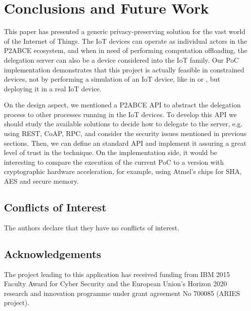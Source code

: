 \section{Conclusions and Future Work}\label{ch:conclusions}

This paper has presented a generic privacy-preserving solution for the vast world of the Internet of Things. The IoT devices can operate as individual actors in the P2ABCE ecosystem, and when in need of performing computation offloading, the delegation server can also be a device considered into the IoT family.
Our PoC implementation demonstrates that this project is actually feasible in constrained devices, not by performing a simulation of an IoT device, like in \cite{vanet} or \cite{alcaide2013anonymous}, but deploying it in a real IoT device.

On the design aspect, we mentioned a P2ABCE API to abstract the delegation process to other processes running in the IoT devices. To develop this API we should study the available solutions to decide how to delegate to the server, e.g. using REST, CoAP, RPC, and consider the security issues mentioned in previous sections. Then, we can define an standard API and implement it assuring a great level of trust in the technique.
On the implementation side, it would be interesting to compare the execution of the current PoC to a version with cryptographic hardware acceleration, for example, using Atmel's chips for SHA, AES and secure memory.


\subsection*{Conflicts of Interest}

The authors declare that they have no conflicts of interest.

\subsection*{Acknowledgements}

The project leading to this application has received funding from IBM 2015 Faculty Award for Cyber Security and the European Union’s Horizon 2020 research and innovation programme under grant agreement No 700085 (ARIES project).
